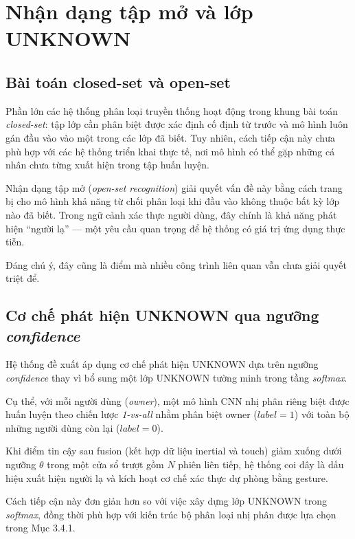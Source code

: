 \documentclass[../DoAn.tex]{subfiles}
\begin{document}
    \section{Nhận dạng tập mở và lớp UNKNOWN}

    \subsection{Bài toán closed-set và open-set}
    
    Phần lớn các hệ thống phân loại truyền thống hoạt động trong khung bài toán \textit{closed-set}: tập lớp cần phân biệt được xác định cố định từ trước và mô hình luôn gán đầu vào vào một trong các lớp đã biết. Tuy nhiên, cách tiếp cận này chưa phù hợp với các hệ thống triển khai thực tế, nơi mô hình có thể gặp những cá nhân chưa từng xuất hiện trong tập huấn luyện.
    
    Nhận dạng tập mở (\textit{open-set recognition}) giải quyết vấn đề này bằng cách trang bị cho mô hình khả năng từ chối phân loại khi đầu vào không thuộc bất kỳ lớp nào đã biết. Trong ngữ cảnh xác thực người dùng, đây chính là khả năng phát hiện ``người lạ'' --- một yêu cầu quan trọng để hệ thống có giá trị ứng dụng thực tiễn.
    
    Đáng chú ý, đây cũng là điểm mà nhiều công trình liên quan vẫn chưa giải quyết triệt để.
    
    \subsection{Cơ chế phát hiện UNKNOWN qua ngưỡng \textit{confidence}}
    
    Hệ thống đề xuất áp dụng cơ chế phát hiện UNKNOWN dựa trên ngưỡng \textit{confidence} thay vì bổ sung một lớp UNKNOWN tường minh trong tầng \textit{softmax}.
    
    Cụ thể, với mỗi người dùng (\textit{owner}), một mô hình CNN nhị phân riêng biệt được huấn luyện theo chiến lược \textit{1-vs-all} nhằm phân biệt owner ($label = 1$) với toàn bộ những người dùng còn lại ($label = 0$).
    
    Khi điểm tin cậy sau fusion (kết hợp dữ liệu inertial và touch) giảm xuống dưới ngưỡng $\theta$ trong một cửa sổ trượt gồm $N$ phiên liên tiếp, hệ thống coi đây là dấu hiệu xuất hiện người lạ và kích hoạt cơ chế xác thực dự phòng bằng gesture.
    
    Cách tiếp cận này đơn giản hơn so với việc xây dựng lớp UNKNOWN trong \textit{softmax}, đồng thời phù hợp với kiến trúc bộ phân loại nhị phân được lựa chọn trong Mục 3.4.1.
    
\end{document}
